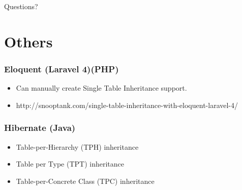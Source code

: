 \documentclass{beamer}
\begin{document}
\begin{frame}
	\Huge{\centerline{Questions?}}
\end{frame}

\section{Others}

\begin{frame}
	\frametitle{Eloquent (Laravel 4)(PHP)}
	
	\begin{itemize}
		\item Can manually create Single Table Inheritance support.
		\item http://snooptank.com/single-table-inheritance-with-eloquent-laravel-4/
	\end{itemize}
\end{frame}

\begin{frame}
	\frametitle{Hibernate (Java)}
	
	\begin{itemize}
		\item Table-per-Hierarchy (TPH) inheritance
		\item Table per Type (TPT) inheritance
		\item Table-per-Concrete Class (TPC) inheritance
	\end{itemize}

\end{frame}
\end{document}
